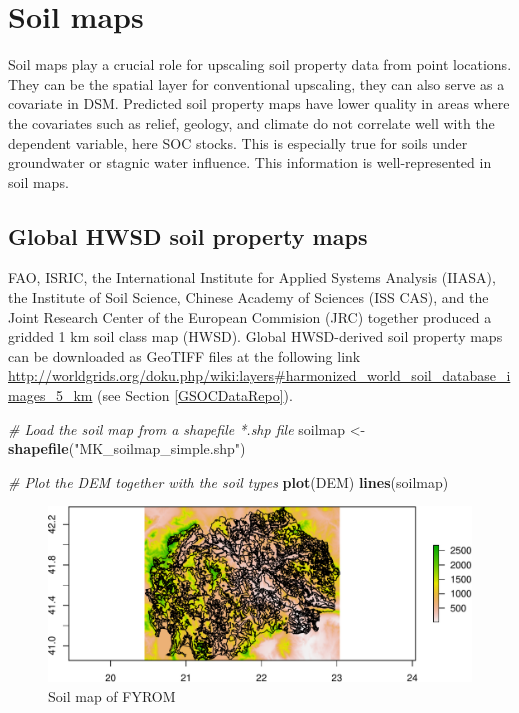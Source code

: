 \documentclass[10pt,b5paper,]{book}
\newenvironment{Shaded}{\begin{snugshade}}{\end{snugshade}}
\newcommand{\CommentTok}[1]{\textcolor[rgb]{0.56,0.35,0.01}{\textit{#1}}}
\newcommand{\KeywordTok}[1]{\textcolor[rgb]{0.13,0.29,0.53}{\textbf{#1}}}
\newcommand{\NormalTok}[1]{#1}
\newcommand{\StringTok}[1]{\textcolor[rgb]{0.31,0.60,0.02}{#1}}
\theoremstyle{definition}
\theoremstyle{definition}
\theoremstyle{definition}
\theoremstyle{remark}
\begin{document}
\hypertarget{soil-maps}{%
\section{Soil maps}\label{soil-maps}}

Soil maps play a crucial role for upscaling soil property data from
point locations. They can be the spatial layer for conventional
upscaling, they can also serve as a covariate in DSM. Predicted soil
property maps have lower quality in areas where the covariates such as
relief, geology, and climate do not correlate well with the dependent
variable, here SOC stocks. This is especially true for soils under
groundwater or stagnic water influence. This information is
well-represented in soil maps.

\hypertarget{global-hwsd-soil-property-maps}{%
\subsection{Global HWSD soil property
maps}\label{global-hwsd-soil-property-maps}}

FAO, ISRIC, the International Institute for Applied Systems Analysis
(IIASA), the Institute of Soil Science, Chinese Academy of Sciences (ISS
CAS), and the Joint Research Center of the European Commision (JRC)
together produced a gridded 1 km soil class map (HWSD). Global
HWSD-derived soil property maps can be downloaded as GeoTIFF files at
the following link
\url{http://worldgrids.org/doku.php/wiki:layers\#harmonized_world_soil_database_images_5_km}
(see Section \ref{GSOCDataRepo}).

\begin{Shaded}
\begin{Highlighting}[]
\CommentTok{# Load the soil map from a shapefile *.shp file}
\NormalTok{soilmap <-}\StringTok{ }\KeywordTok{shapefile}\NormalTok{(}\StringTok{"MK_soilmap_simple.shp"}\NormalTok{)}

\CommentTok{# Plot the DEM together with the soil types}
\KeywordTok{plot}\NormalTok{(DEM)}
\KeywordTok{lines}\NormalTok{(soilmap)}
\end{Highlighting}
\end{Shaded}

\begin{figure}
\centering
\includegraphics{SOCMapping_files/figure-latex/unnamed-chunk-19-1.pdf}
\caption{\label{fig:unnamed-chunk-19}Soil map of FYROM}
\end{figure}
\end{document}

